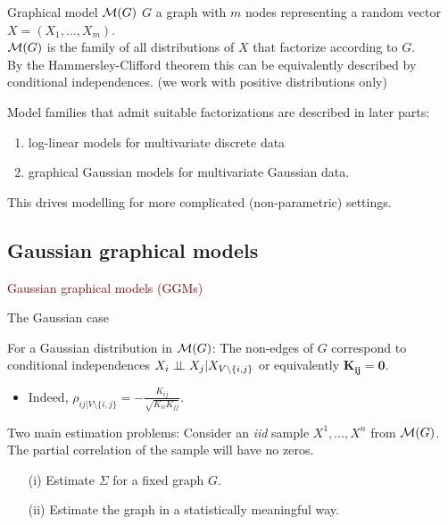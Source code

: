 \documentclass[11pt,handout,aspectratio=169,dvipsnames]{beamer}
\begin{document}
\begin{frame}{Graphical model ${\cal M}(G)$}
	$G$ a graph with $m$ nodes representing a random vector $X=(X_1,\ldots,X_m)$.\\[.3cm]
	${\cal M}(G)$ is the family of all distributions of $X$ that factorize according to $G$. \\[.3cm]
	By the Hammersley-Clifford theorem this can be equivalently described by conditional independences. (we work with positive distributions only)
	\bigskip
	
	Model families that admit suitable factorizations are described in later parts:
\begin{enumerate}
	\item \textcolor{SeaGreen!80!black}{log-linear models} for multivariate discrete data
	\item graphical \textcolor{SeaGreen!80!black}{Gaussian models} for multivariate Gaussian data.
\end{enumerate}
This drives modelling for more complicated (non-parametric) settings.
\end{frame}


\subsection{Gaussian graphical models}
\begin{frame}{}
\begin{center}
	{\huge \textcolor{DarkRed}{Gaussian graphical models (GGMs)}}
\end{center}
\end{frame}


\begin{frame}{The Gaussian case}
\begin{alertblock}{For a Gaussian distribution in ${\cal M}(G)$:}
		The  non-edges of $G$ correspond to conditional independences $X_i\perp\!\!\! \perp X_j|X_{V\setminus \{i,j\}}$ or equivalently \alert{$\mathbf{K_{ij}=0}$}.
		\begin{itemize}
			\item Indeed, $\rho_{ij|V\setminus \{i,j\}}=-\tfrac{K_{ij}}{\sqrt{K_{ii}K_{jj}}}$.
		\end{itemize}
\end{alertblock}
\medskip

\begin{alertblock}{Two main estimation problems:}
	Consider an \emph{iid} sample $X^{1},\ldots,X^n$ from ${\cal M}(G)$.\\[.2cm]
The partial correlation of the sample will have no zeros.
\begin{enumerate}
	\item [(i)] Estimate $\Sigma$ for a fixed graph $G$.
	\item [(ii)] Estimate the graph in a statistically meaningful way.
\end{enumerate} 
\end{alertblock}
\end{frame}
\end{document}
